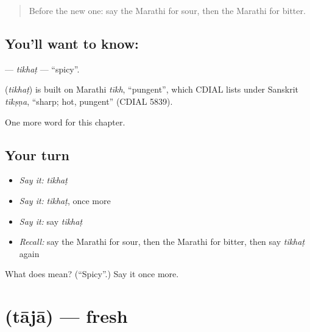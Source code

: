 \label{lesson:MR-C149-tikhat}



\begin{quote}
Before the new one: say the Marathi for sour, then the Marathi for bitter.
\end{quote}

\subsection*{You'll want to know: }
\textbf{} — \emph{tikhaṭ} — \textquotedblleft{}spicy\textquotedblright{}.

\begin{cousinweb}
\textbf{} (\emph{tikhaṭ}) is built on Marathi \emph{tīkh}, \textquotedblleft{}pungent\textquotedblright{}, which CDIAL lists under Sanskrit \emph{tīkṣṇa}, \textquotedblleft{}sharp; hot, pungent\textquotedblright{} (CDIAL 5839).
\end{cousinweb}

\begin{grammarlens}[title={What you've built}]
One more word for this chapter.
\end{grammarlens}

\subsection*{Your turn}
\begin{itemize}
\raggedright
  \item \emph{Say it:} \emph{tikhaṭ}
  \item \emph{Say it:} \emph{tikhaṭ}, once more
  \item \emph{Say it:} say \emph{tikhaṭ}
  \item \emph{Recall:} say the Marathi for sour, then the Marathi for bitter, then say \emph{tikhaṭ} again
\end{itemize}

\begin{tcolorbox}[breakable,colback=teal!4,colframe=teal!35!black,title={Before you move on}]
What does  mean? (\textquotedblleft{}Spicy\textquotedblright{}.) Say it once more.
\end{tcolorbox}
\section[\texorpdfstring{\mr{ताजा} (tājā)}{ताजा (tājā)}]{ (tājā) — fresh}

\label{lesson:MR-C149-taja}



